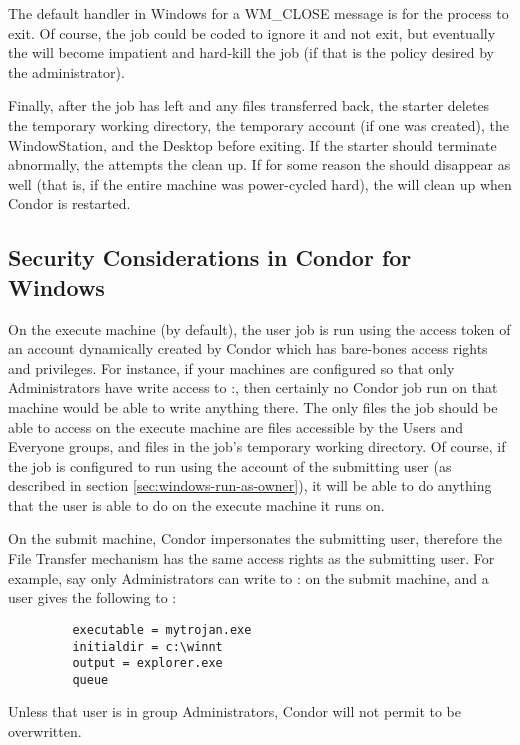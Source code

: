 \Note The default handler in Windows for a WM\_CLOSE message is for the
process to exit.  Of course, the job could be coded to ignore it and not
exit, but eventually the  will become impatient and hard-kill
the job (if that is the policy desired by the administrator).

Finally, after the job has left and any files transferred back, the
starter deletes the temporary working directory, the temporary account
(if one was created), the WindowStation, and the Desktop before
exiting.  If the starter should terminate abnormally, the
 attempts the clean up.  If for some reason the
 should disappear as well (that is, if the entire
machine was power-cycled hard), the  will clean up when
Condor is restarted.

\subsection{Security Considerations in Condor for Windows}


On the execute machine (by default), the user job is run using the
access token of an account dynamically created by Condor which has
bare-bones access rights and privileges.  For instance, if your
machines are configured so that only Administrators have write access
to
\verb@C:\WINNT@, then certainly no Condor job run on that machine
would be able to write anything there.  The only files the job should
be able to access on the execute machine are files accessible by the
Users and Everyone groups, and files in the job's temporary working
directory.  Of course, if the job is configured to run using the
account of the submitting user (as described in section
\ref{sec:windows-run-as-owner}), it will be able to do anything that
the user is able to do on the execute machine it runs on.

On the submit machine, Condor impersonates the submitting user, therefore
the File Transfer mechanism has the same access rights as the submitting
user.  For example, say only Administrators can write to
\verb@C:\WINNT@
on the submit machine,
and a user gives the following to  :
\begin{verbatim}
         executable = mytrojan.exe
         initialdir = c:\winnt
         output = explorer.exe
         queue
\end{verbatim}
Unless that user is in group Administrators, Condor will not permit
 to be overwritten.  

